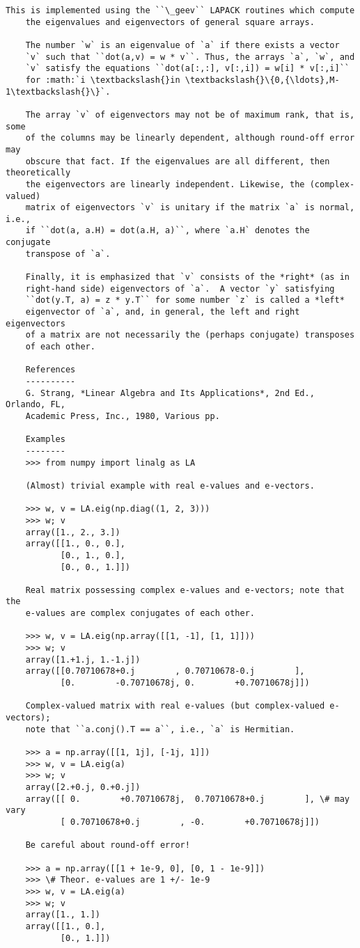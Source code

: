 \documentclass[11pt]{article}
\begin{document}
\begin{Verbatim}[commandchars=\\\{\}]
    This is implemented using the ``\_geev`` LAPACK routines which compute
    the eigenvalues and eigenvectors of general square arrays.

    The number `w` is an eigenvalue of `a` if there exists a vector
    `v` such that ``dot(a,v) = w * v``. Thus, the arrays `a`, `w`, and
    `v` satisfy the equations ``dot(a[:,:], v[:,i]) = w[i] * v[:,i]``
    for :math:`i \textbackslash{}in \textbackslash{}\{0,{\ldots},M-1\textbackslash{}\}`.

    The array `v` of eigenvectors may not be of maximum rank, that is, some
    of the columns may be linearly dependent, although round-off error may
    obscure that fact. If the eigenvalues are all different, then theoretically
    the eigenvectors are linearly independent. Likewise, the (complex-valued)
    matrix of eigenvectors `v` is unitary if the matrix `a` is normal, i.e.,
    if ``dot(a, a.H) = dot(a.H, a)``, where `a.H` denotes the conjugate
    transpose of `a`.

    Finally, it is emphasized that `v` consists of the *right* (as in
    right-hand side) eigenvectors of `a`.  A vector `y` satisfying
    ``dot(y.T, a) = z * y.T`` for some number `z` is called a *left*
    eigenvector of `a`, and, in general, the left and right eigenvectors
    of a matrix are not necessarily the (perhaps conjugate) transposes
    of each other.

    References
    ----------
    G. Strang, *Linear Algebra and Its Applications*, 2nd Ed., Orlando, FL,
    Academic Press, Inc., 1980, Various pp.

    Examples
    --------
    >>> from numpy import linalg as LA

    (Almost) trivial example with real e-values and e-vectors.

    >>> w, v = LA.eig(np.diag((1, 2, 3)))
    >>> w; v
    array([1., 2., 3.])
    array([[1., 0., 0.],
           [0., 1., 0.],
           [0., 0., 1.]])

    Real matrix possessing complex e-values and e-vectors; note that the
    e-values are complex conjugates of each other.

    >>> w, v = LA.eig(np.array([[1, -1], [1, 1]]))
    >>> w; v
    array([1.+1.j, 1.-1.j])
    array([[0.70710678+0.j        , 0.70710678-0.j        ],
           [0.        -0.70710678j, 0.        +0.70710678j]])

    Complex-valued matrix with real e-values (but complex-valued e-vectors);
    note that ``a.conj().T == a``, i.e., `a` is Hermitian.

    >>> a = np.array([[1, 1j], [-1j, 1]])
    >>> w, v = LA.eig(a)
    >>> w; v
    array([2.+0.j, 0.+0.j])
    array([[ 0.        +0.70710678j,  0.70710678+0.j        ], \# may vary
           [ 0.70710678+0.j        , -0.        +0.70710678j]])

    Be careful about round-off error!

    >>> a = np.array([[1 + 1e-9, 0], [0, 1 - 1e-9]])
    >>> \# Theor. e-values are 1 +/- 1e-9
    >>> w, v = LA.eig(a)
    >>> w; v
    array([1., 1.])
    array([[1., 0.],
           [0., 1.]])

    \end{Verbatim}
\end{document}
